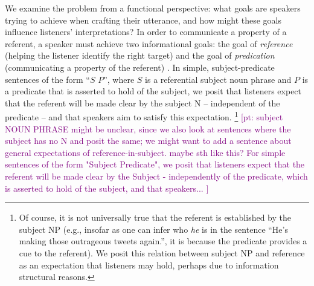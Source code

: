 \documentclass[10pt,letterpaper]{article}
\newcommand{\mht}[1]{\textcolor{Blue}{[mht: #1]}}
\newcommand{\pt}[1]{\textcolor{Purple}{[pt: #1]}}
\begin{document}
We examine the problem from a functional perspective: what goals are speakers trying to achieve when crafting their utterance, and how might these goals influence listeners’ interpretations?  %
In order to communicate a property of a referent, a speaker must achieve two informational goals: the goal of \emph{reference} (helping the listener identify the right target) and the goal of \emph{predication} (communicating a property of the referent) \cite{Reboul2001}. 
In simple, subject-predicate sentences of the form ``$S$ $P$'', where $S$ is a referential subject noun phrase and $P$ is a predicate that is asserted to hold of the subject, we posit that listeners expect that the referent will be made clear by the subject N -- independent of the predicate -- and that speakers aim to satisfy this expectation.
\footnote{Of course, it is not universally true that the referent is established by the subject NP (e.g., insofar as one can infer who \emph{he} is in the sentence ``He's making those outrageous tweets again.'', it is because the predicate provides a cue to the referent). We posit this relation between subject NP and reference as an expectation that listeners may hold, perhaps due to information structural reasons.
}
\pt{subject NOUN PHRASE might be unclear, since we also look at sentences where the subject has no N and posit the same; we might want to add a sentence about general expectations of reference-in-subject. maybe sth like this? For simple sentences of the form "Subject Predicate", we posit that listeners expect that the referent will be made clear by the Subject - independently of the predicate, which is asserted to hold of the subject, and that speakers... }  
%
%
%
\end{document}
